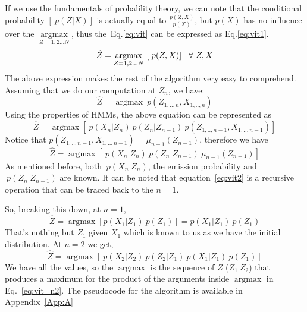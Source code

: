 \documentclass[10pt,journal,compsoc]{IEEEtran} %
\begin{document}
If we use the fundamentals of probalility theory, we can note that the conditional probability $[~p(Z|X)]$ is actually equal to $\frac{p(Z,X)}{p(X)}$, but $p(X)$ has no influence over the $\underset{Z=1,2...N}{\operatorname{argmax}}$, thus the~Eq.\ref{eq:vit} can be expressed as Eq.\ref{eq:vit1}.
\begin{equation}
\hat{Z} = \underset{Z=1,2...N}{\operatorname{argmax}}~[~p(Z,X)] \hspace{0.3cm} \forall ~Z, X
\label{eq:vit1}
\end{equation}
The above expression makes the rest of the algorithm very easy to comprehend. Assuming that we do our computation at $Z_n$, we have:
\begin{equation}
\hat{Z} = {\operatorname{argmax}}~p(Z_{1,..,n},X_{1,..,n})
\end{equation}
Using the properties of HMMs, the above equation can be represented as
\begin{equation}
\hat{Z} = {\operatorname{argmax}}[~p(X_{n}|Z_{n})~p(Z_{n}|Z_{n-1})~p(Z_{1,..,n-1},X_{1,..,n-1})]
\label{eq:vit3}
\end{equation}
Notice that $p(Z_{1,..,n-1},X_{1,..,n-1}) = \mu_{n-1}(Z_{n-1})$, therefore we have
\begin{equation}
\hat{Z} = {\operatorname{argmax}}[~p(X_{n}|Z_{n})~p(Z_{n}|Z_{n-1})~\mu_{n-1}(Z_{n-1})]
\label{eq:vit2}
\end{equation}
As mentioned before, both $~p(X_{n}|Z_{n})$, the emission probability and $~p(Z_{n}|Z_{n-1})$ are known. It can be noted that equation~\ref{eq:vit2} is a recursive operation that can be traced back to the $n=1$. 

So, breaking this down, at $n=1$,
\begin{equation}
\hat{Z} = {\operatorname{argmax}}[p(X_{1}|Z_{1})~p(Z_{1})] = p(X_{1}|Z_{1})~p(Z_{1})
\end{equation}
That's nothing but $Z_1$ given $X_1$ which is known to us as we have the initial distribution. At $n=2$ we get,
\begin{equation}
\hat{Z} = {\operatorname{argmax}}[~p(X_{2}|Z_{2})~p(Z_{2}|Z_{1})~p(X_{1}|Z_{1})~p(Z_{1})] 
\label{eq:vit_n2}
\end{equation}
We have all the values, so the $\operatorname{argmax}$ is the sequence of $Z$ ($Z_1~Z_2$) that produces a maximum for the product of the arguments inside $\operatorname{argmax}$ in Eq.~\ref{eq:vit_n2}. The pseudocode for the algorithm is available in Appendix~\ref{App:A}
\end{document}
